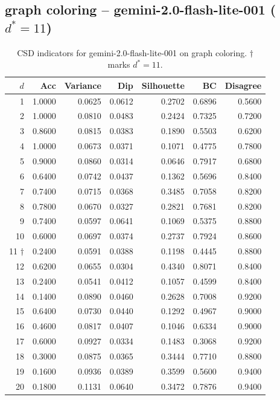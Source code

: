 \documentclass[11pt]{article}
\begin{document}
\subsection{graph coloring -- gemini-2.0-flash-lite-001 ($d^*=11$)}

\begin{table}[h]\centering\small
\begin{tabular}{r|r|r|r|r|r|r}
\toprule
$d$ & Acc & Variance & Dip & Silhouette & BC & Disagree \\
\midrule
1 & 1.0000 & 0.0625 & 0.0612 & 0.2702 & 0.6896 & 0.5600 \\
2 & 1.0000 & 0.0810 & 0.0483 & 0.2424 & 0.7325 & 0.7200 \\
3 & 0.8600 & 0.0815 & 0.0383 & 0.1890 & 0.5503 & 0.6200 \\
4 & 1.0000 & 0.0673 & 0.0371 & 0.1071 & 0.4775 & 0.7800 \\
5 & 0.9000 & 0.0860 & 0.0314 & 0.0646 & 0.7917 & 0.6800 \\
6 & 0.6400 & 0.0742 & 0.0437 & 0.1362 & 0.5696 & 0.8400 \\
7 & 0.7400 & 0.0715 & 0.0368 & 0.3485 & 0.7058 & 0.8200 \\
8 & 0.7800 & 0.0670 & 0.0327 & 0.2821 & 0.7681 & 0.8200 \\
9 & 0.7400 & 0.0597 & 0.0641 & 0.1069 & 0.5375 & 0.8800 \\
10 & 0.6000 & 0.0697 & 0.0374 & 0.2737 & 0.7924 & 0.8600 \\
11 $\dagger$ & 0.2400 & 0.0591 & 0.0388 & 0.1198 & 0.4445 & 0.8800 \\
12 & 0.6200 & 0.0655 & 0.0304 & 0.4340 & 0.8071 & 0.8400 \\
13 & 0.2400 & 0.0541 & 0.0412 & 0.1057 & 0.4599 & 0.8400 \\
14 & 0.1400 & 0.0890 & 0.0460 & 0.2628 & 0.7008 & 0.9200 \\
15 & 0.6400 & 0.0730 & 0.0440 & 0.1292 & 0.4967 & 0.9000 \\
16 & 0.4600 & 0.0817 & 0.0407 & 0.1046 & 0.6334 & 0.9000 \\
17 & 0.6000 & 0.0927 & 0.0334 & 0.1483 & 0.3068 & 0.9200 \\
18 & 0.3000 & 0.0875 & 0.0365 & 0.3444 & 0.7710 & 0.8800 \\
19 & 0.1600 & 0.0936 & 0.0389 & 0.3599 & 0.5600 & 0.9400 \\
20 & 0.1800 & 0.1131 & 0.0640 & 0.3472 & 0.7876 & 0.9400 \\
\bottomrule
\end{tabular}
\caption{CSD indicators for gemini-2.0-flash-lite-001 on graph coloring. $\dagger$ marks $d^*=11$.}
\end{table}
\end{document}
